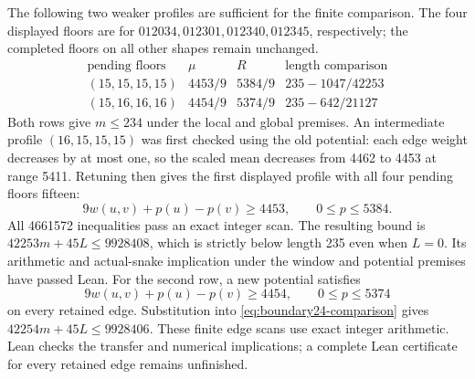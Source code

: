 \documentclass[11pt,a4paper]{article}
\theoremstyle{definition}
\theoremstyle{remark}
\begin{document}
The following two weaker profiles are sufficient for the finite comparison.
The four displayed floors are for $012034,012301,012340,012345$, respectively;
the completed floors on all other shapes remain unchanged.
\[
\begin{array}{c|c|c|c}
\text{pending floors}&\mu&R&\text{length comparison}\\\hline
(15,15,15,15)&4453/9&5384/9&235-1047/42253\\
(15,16,16,16)&4454/9&5374/9&235-642/21127
\end{array}
\]
Both rows give $m\le234$ under the local and global premises.
An intermediate profile $(16,15,15,15)$ was first checked using the
old potential: each edge weight decreases by at most one, so the scaled
mean decreases from 4462 to 4453 at range 5411. Retuning then gives the
first displayed profile with all four pending floors fifteen:
\[
9w(u,v)+p(u)-p(v)\ge4453,\qquad 0\le p\le5384.
\]
All 4661572 inequalities pass an exact integer scan. The resulting bound
is $42253m+45L\le9928408$, which is strictly below length 235 even when
$L=0$. Its arithmetic and actual-snake implication under the window and
potential premises have passed Lean.
For the second row, a new potential satisfies
\[
9w(u,v)+p(u)-p(v)\ge4454,\qquad 0\le p\le5374
\]
on every retained edge. Substitution into
\eqref{eq:boundary24-comparison} gives
$42254m+45L\le9928406$. These finite edge scans use exact integer
arithmetic. Lean checks the transfer and numerical implications;
a complete Lean certificate for every retained edge remains unfinished.
\end{document}
